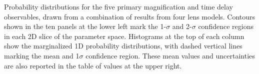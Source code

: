 Probability distributions for the five primary magnification and time
delay observables, drawn from a combination of results from four lens
models.  Contours shown in the ten panels at the lower left mark the
1-$\sigma$ and 2-$\sigma$ confidence regions in each 2D slice of the
parameter space. Histograms at the top of each column show the
marginalized 1D probability distributions, with dashed vertical lines
marking the mean and 1$\sigma$ confidence region.  These mean values
and uncertainties are also reported in the table of values at the
upper right.
\label{fig:LensModelContours}
